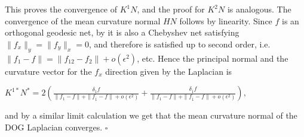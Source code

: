 This proves the convergence of $K^1N$, and the proof for $K^2N$ is analogous. The convergence of the mean curvature normal $HN$ follows by linearity.
Since $f$ is an orthogonal geodesic net, by  it is also a Chebyshev net satisfying $\|f_x\|_y = \|f_y\|_x = 0$, and therefore  is satisfied up to second order, i.e.\ $\|f_1-f\| = \|f_{12}-f_2\| + o(\epsilon^2)$, etc. Hence the principal normal and the curvature vector for the $f_x$ direction given by the Laplacian is

$K^{1*}N^* = 2\left(\frac{\delta_1 f}{\|f_1-f\| + \|f_{\bar1}-f\| + o(\epsilon^2)} + \frac{\delta_{\bar1}f}{\|f_1-f\| + \|f_{\bar1}-f\| + o(\epsilon^2)}\right),
$

\noindent
and by a similar limit calculation we get that the mean curvature normal of the DOG Laplacian converges. \hfill$\square$


